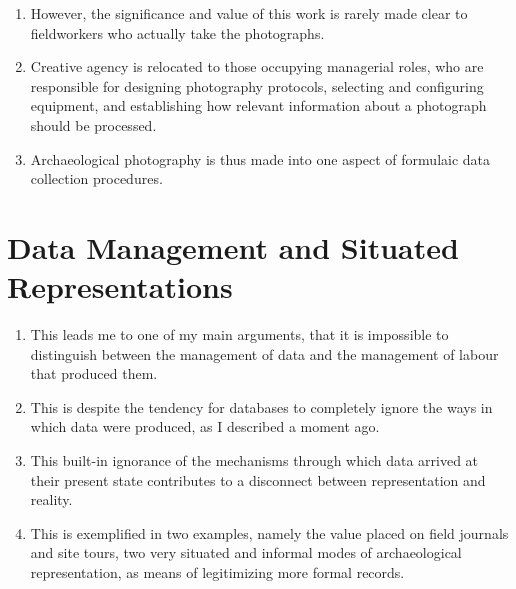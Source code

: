 \documentclass{article}
\begin{document}
\begin{enumerate}
  \item However, the significance and value of this work is rarely made clear to fieldworkers who actually take the photographs.
  \item Creative agency is relocated to those occupying managerial roles, who are responsible for designing photography protocols, selecting and configuring equipment, and establishing how relevant information about a photograph should be processed.
  \item Archaeological photography is thus made into one aspect of formulaic data collection procedures.
\end{enumerate}

\section{Data Management and Situated Representations}
\begin{enumerate}
  \item This leads me to one of my main arguments, that it is impossible to distinguish between the management of data and the management of labour that produced them.
  \item This is despite the tendency for databases to completely ignore the ways in which data were produced, as I described a moment ago.
  \item This built-in ignorance of the mechanisms through which data arrived at their present state contributes to a disconnect between representation and reality.
  \item This is exemplified in two examples, namely the value placed on field journals and site tours, two very situated and informal modes of archaeological representation, as means of legitimizing more formal records.
\end{enumerate}
\end{document}

